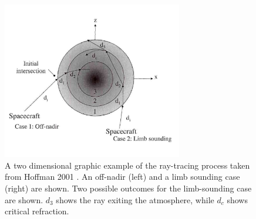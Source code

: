 \begin{figure}[p]
    \centering
	\includegraphics[width=0.7\textwidth]{./rtm/ray-trace.png}
	\caption{A two dimensional graphic example of the ray-tracing process taken from Hoffman 2001 \cite{Hoffman-thesis}. An off-nadir (left) and a limb sounding case (right) are shown. Two possible outcomes for the limb-sounding case are shown. $d_3$ shows the ray exiting the atmosphere, while $d_c$ shows critical refraction.}
		\label{fig:ray-tracing}
\end{figure}

\clearpage
